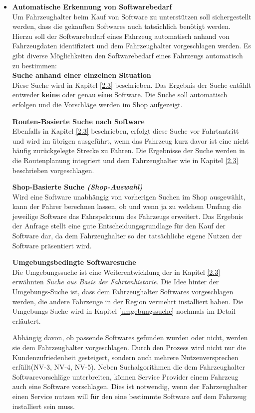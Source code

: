 \begin{itemize}
	\item[] \hspace{-0.6cm} \textbf{Automatische Erkennung von Softwarebedarf}\\
	Um Fahrzeughalter beim Kauf von Software zu unterstützen soll sichergestellt werden, dass die gekauften Softwares auch tatsächlich benötigt werden. Hierzu soll der Softwarebedarf eines Fahrzeug automatisch anhand von Fahrzeugdaten identifiziert und dem Fahrzeughalter vorgeschlagen werden. Es gibt diverse Möglichkeiten den Softwarebedarf eines Fahrzeugs automatisch zu bestimmen:\\	
	\subitem \textbf{Suche anhand einer einzelnen Situation} \\
		Diese Suche wird in Kapitel \ref{2.3} beschrieben. Das Ergebnis der Suche entählt entweder \textbf{keine} oder genau \textbf{eine }Software. Die Suche soll automatisch erfolgen und die Vorschläge werden im Shop aufgezeigt.
		
	\subitem \textbf{Routen-Basierte Suche nach Software}\\
		Ebenfalls in Kapitel \ref{2.3} beschrieben, erfolgt diese Suche vor Fahrtantritt und wird im übrigen ausgeführt, wenn das Fahrzeug kurz davor ist eine nicht häufig zurückgelegte Strecke zu Fahren. Die Ergebnisse der Suche werden in die Routenplanung integriert und dem Fahrzeughalter wie in Kapitel \ref{2.3} beschrieben vorgeschlagen.
		
	\subitem \textbf{Shop-Basierte Suche \textit{(Shop-Auswahl)}}\\
		Wird eine Software unabhängig von vorherigen Suchen im Shop ausgewählt, kann der Fahrer berechnen lassen, ob und wenn ja zu welchem Umfang die jeweilige Software das Fahrspektrum des Fahrzeugs erweitert. Das Ergebnis der Anfrage stellt eine gute Entscheidungsgrundlage für den Kauf der Software dar, da dem Fahrzeughalter so der tatsächliche eigene Nutzen der Software präsentiert wird.
		
	\subitem \textbf{Umgebungsbedingte Softwaresuche}\\
		Die Umgebungssuche ist eine Weiterentwicklung der in Kapitel \ref{2.3} erwähnten \textit{Suche aus Basis der Fahrtenhistorie.} Die Idee hinter der Umgebungs-Suche ist, dass dem Fahrzeughalter Softwares vorgeschlagen werden, die andere Fahrzeuge in der Region vermehrt installiert haben. Die Umgebungs-Suche wird in Kapitel \ref{umgebungssuche} nochmals im Detail erläutert.
	
	Abhängig davon, ob passende Softwares gefunden wurden oder nicht, werden sie dem Fahrzeughalter vorgeschlagen. Durch den Prozess wird nicht nur die Kundenzufriedenheit gesteigert, sondern auch mehrere Nutzenversprechen erfüllt(NV-3, NV-4, NV-5). Neben Suchalgorithmen die dem Fahrzeughalter Softwarevorschläge unterbreiten, können Service Provider einem Fahrzeug auch eine Software vorschlagen. Dies ist notwendig, wenn der Fahrzeughalter einen Service nutzen will für den eine bestimmte Software auf dem Fahrzeug installiert sein muss.


\end{itemize}

